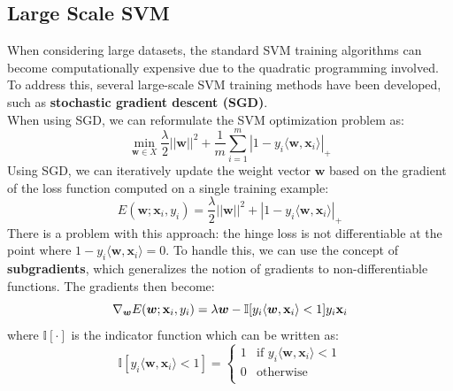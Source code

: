 \subsection{Large Scale SVM}
When considering large datasets, the standard SVM training algorithms can become computationally expensive 
due to the quadratic programming involved.
To address this, several large-scale SVM training methods have been developed, 
such as \textbf{stochastic gradient descent (SGD)}.
\\When using SGD, we can reformulate the SVM optimization problem as:
\begin{equation}
    \min_{\boldsymbol{w} \in X} \frac{\lambda}{2} ||\boldsymbol{w}||^2  + \frac{1}{m} \sum_{i=1}^{m} |1 - y_i \langle \boldsymbol{w}, \boldsymbol{x}_i \rangle|_+
\end{equation}
Using SGD, we can iteratively update the weight vector $\boldsymbol{w}$ based on the gradient of the loss function computed on a single training example:
\begin{equation}
    E(\boldsymbol{w}; \boldsymbol{x}_i, y_i) = \frac{\lambda}{2} ||\boldsymbol{w}||^2 + |1 - y_i \langle \boldsymbol{w}, \boldsymbol{x}_i \rangle|_+
\end{equation} 
There is a problem with this approach: the hinge loss is not differentiable at the point where $1 - y_i \langle \boldsymbol{w}, \boldsymbol{x}_i \rangle = 0$.
To handle this, we can use the concept of \textbf{subgradients}, which generalizes the notion of gradients to non-differentiable functions.
The gradients then become:
\begin{equation}
    \nabla_{\boldsymbol{w}} E(\boldsymbol{w}; \bold{x}_i, y_i) = \lambda \boldsymbol{w} - \mathbb{I}[y_i \langle \boldsymbol{w}, \bold{x}_i \rangle < 1] y_i \bold{x}_i
\end{equation}
where $\mathbb{I}[\cdot]$ is the indicator function which can be written as:
\[
\mathbb{I}[y_i \langle \boldsymbol{w}, \boldsymbol{x}_i \rangle < 1] = \begin{cases}
1 & \text{if } y_i \langle \boldsymbol{w}, \boldsymbol{x}_i \rangle < 1 \\
0 & \text{otherwise}\\
\end{cases}
\]
